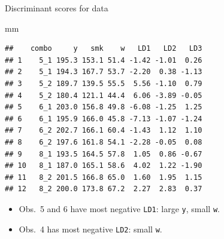 \documentclass[ignorenonframetext,]{beamer}
\newenvironment{Shaded}{\begin{snugshade}}{\end{snugshade}}
\newcommand{\NormalTok}[1]{#1}
\begin{document}
\begin{frame}[fragile]{Discriminant scores for data}
\protect\hypertarget{discriminant-scores-for-data}{}

\footnotesize

\begin{Shaded}
\begin{Highlighting}[]
\NormalTok{mm}
\end{Highlighting}
\end{Shaded}

\begin{verbatim}
##    combo     y   smk    w   LD1   LD2   LD3
## 1    5_1 195.3 153.1 51.4 -1.42 -1.01  0.26
## 2    5_1 194.3 167.7 53.7 -2.20  0.38 -1.13
## 3    5_2 189.7 139.5 55.5  5.56 -1.10  0.79
## 4    5_2 180.4 121.1 44.4  6.06 -3.89 -0.05
## 5    6_1 203.0 156.8 49.8 -6.08 -1.25  1.25
## 6    6_1 195.9 166.0 45.8 -7.13 -1.07 -1.24
## 7    6_2 202.7 166.1 60.4 -1.43  1.12  1.10
## 8    6_2 197.6 161.8 54.1 -2.28 -0.05  0.08
## 9    8_1 193.5 164.5 57.8  1.05  0.86 -0.67
## 10   8_1 187.0 165.1 58.6  4.02  1.22 -1.90
## 11   8_2 201.5 166.8 65.0  1.60  1.95  1.15
## 12   8_2 200.0 173.8 67.2  2.27  2.83  0.37
\end{verbatim}

\normalsize

\begin{itemize}
\item
  Obs.~5 and 6 have most negative \texttt{LD1}: large \texttt{y}, small
  \texttt{w}.
\item
  Obs.~4 has most negative \texttt{LD2}: small \texttt{w}.
\end{itemize}

\end{frame}
\end{document}
